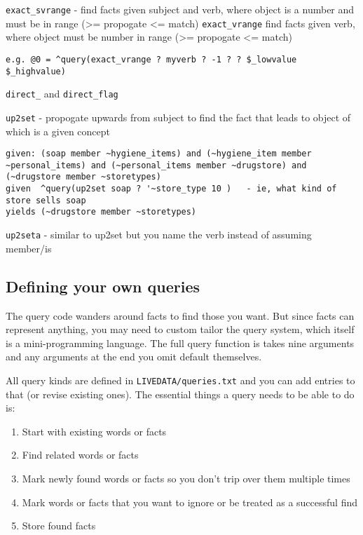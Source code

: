 \documentclass[]{article}
\providecommand{\tightlist}{%
  \setlength{\itemsep}{0pt}\setlength{\parskip}{0pt}}
\begin{document}
\texttt{exact\_svrange} - find facts given subject and verb, where
object is a number and must be in range (\textgreater{}= propogate
\textless{}= match) \texttt{exact\_vrange} find facts given verb, where
object must be number in range (\textgreater{}= propogate \textless{}=
match)

\begin{verbatim}
e.g. @0 = ^query(exact_vrange ? myverb ? -1 ? ? $_lowvalue $_highvalue)
\end{verbatim}

\texttt{direct\_} and \texttt{direct\_flag}

\texttt{up2set} - propogate upwards from subject to find the fact that
leads to object of which is a given concept

\begin{verbatim}
given: (soap member ~hygiene_items) and (~hygiene_item member ~personal_items) and (~personal_items member ~drugstore) and (~drugstore member ~storetypes)
given  ^query(up2set soap ? '~store_type 10 )   - ie, what kind of store sells soap
yields (~drugstore member ~storetypes) 
\end{verbatim}

\texttt{up2seta} - similar to up2set but you name the verb instead of
assuming member/is

\subsection{Defining your own queries}\label{defining-your-own-queries}

The query code wanders around facts to find those you want. But since
facts can represent anything, you may need to custom tailor the query
system, which itself is a mini-programming language. The full query
function is takes nine arguments and any arguments at the end you omit
default themselves.

All query kinds are defined in \texttt{LIVEDATA/queries.txt} and you can
add entries to that (or revise existing ones). The essential things a
query needs to be able to do is:

\begin{enumerate}
\def\labelenumi{\arabic{enumi}.}
\tightlist
\item
  Start with existing words or facts
\item
  Find related words or facts
\item
  Mark newly found words or facts so you don't trip over them multiple
  times
\item
  Mark words or facts that you want to ignore or be treated as a
  successful find
\item
  Store found facts
\end{enumerate}
\end{document}
